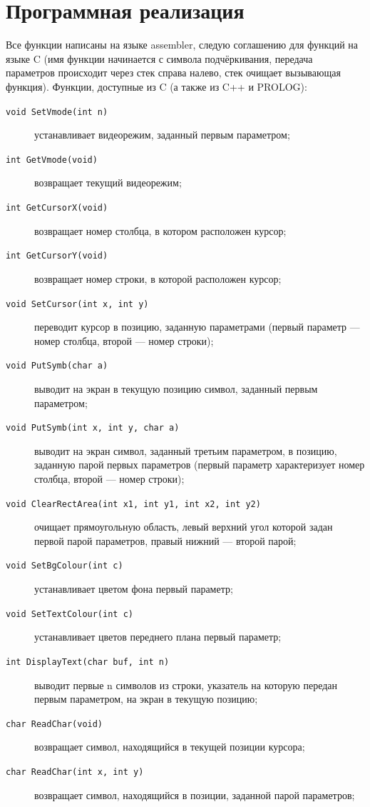 \documentclass[a4paper,12pt,notitlepage,pdftex,headsepline]{scrartcl}
\begin{document}
\section{Программная реализация}
Все функции написаны на языке assembler, следую соглашению для функций на языке C (имя функции начинается с символа подчёркивания, передача параметров происходит через стек справа налево, стек очищает вызывающая функция).
Функции, доступные из C (а также из C++ и PROLOG):
\begin{description}
\item[\texttt{void SetVmode(int n)}] устанавливает видеорежим, заданный первым параметром;
\item[\texttt{int GetVmode(void)}] возвращает текущий видеорежим;
\item[\texttt{int GetCursorX(void)}] возвращает номер столбца, в котором расположен курсор;
\item[\texttt{int GetCursorY(void)}] возвращает номер строки, в которой расположен курсор;
\item[\texttt{void SetCursor(int x, int y)}] переводит курсор в позицию, заданную параметрами (первый параметр --- номер столбца, второй --- номер строки);
\item[\texttt{void PutSymb(char a)}] выводит на экран в текущую позицию символ, заданный первым параметром;
\item[\texttt{void PutSymb(int x, int y, char a)}] выводит на экран символ, заданный третьим параметром, в позицию, заданную парой первых параметров (первый параметр характеризует номер столбца, второй --- номер строки);
\item[\texttt{void ClearRectArea(int x1, int y1, int x2, int y2)}] очищает прямоугольную область, левый верхний угол которой задан первой парой параметров, правый нижний --- второй парой;
\item[\texttt{void SetBgColour(int c)}] устанавливает цветом фона первый параметр;
\item[\texttt{void SetTextColour(int c)}] устанавливает цветов переднего плана первый параметр;
\item[\texttt{int DisplayText(char \*buf, int n)}] выводит первые n символов из строки, указатель на которую передан первым параметром, на экран в текущую позицию;
\item[\texttt{char ReadChar(void)}] возвращает символ, находящийся в текущей позиции курсора;
\item[\texttt{char ReadChar(int x, int y)}] возвращает символ, находящийся в позиции, заданной парой параметров;

\end{description}
\end{document}
